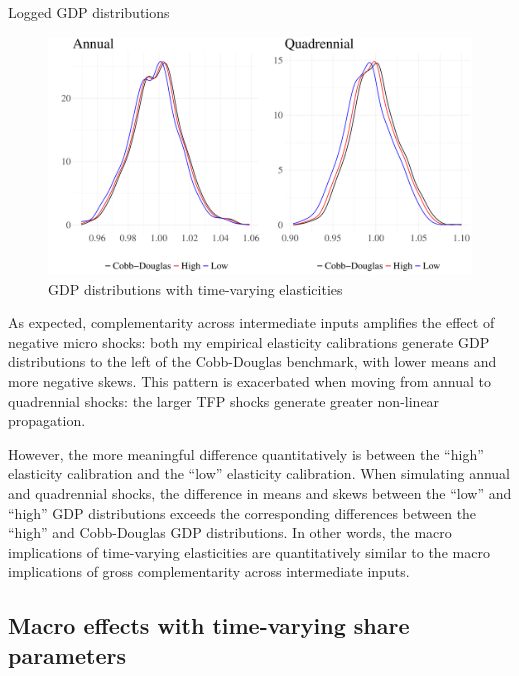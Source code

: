 \documentclass[11pt]{article}
\begin{document}
\begin{table}[!h]
    \centering 
    \caption{Logged GDP distributions}
    \label{tab:shock_results}
    
\end{table}

\begin{figure}[!h]
    \centering 
    \includegraphics[width=\textwidth]{../figures/theory/gdp_het_year.pdf}
    \caption{GDP distributions with time-varying elasticities}
    \label{fig:shock_results_yearhet}
\end{figure}

As expected, complementarity across intermediate inputs amplifies the effect of negative micro shocks: both my empirical elasticity calibrations generate GDP distributions to the left of the Cobb-Douglas benchmark, with lower means and more negative skews. This pattern is exacerbated when moving from annual to quadrennial shocks: the larger TFP shocks generate greater non-linear propagation. 

However, the more meaningful difference quantitatively is between the ``high'' elasticity calibration and the ``low'' elasticity calibration. When simulating annual and quadrennial shocks, the difference in means and skews between the ``low'' and ``high'' GDP distributions exceeds the corresponding differences between the ``high'' and Cobb-Douglas GDP distributions. In other words, the macro implications of time-varying elasticities are quantitatively similar to the macro implications of gross complementarity across intermediate inputs. 

\subsection{Macro effects with time-varying share parameters} 
\end{document}
